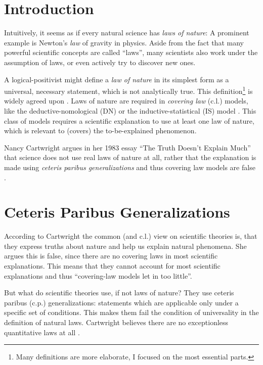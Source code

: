 \section*{Introduction}


Intuitively, it seems as if every natural science has \emph{laws of nature}:
A prominent example is Newton's \emph{law} of gravity in physics.
Aside from the fact that many powerful scientific concepts are called \enquote{laws},
many scientists also work under the assumption of laws, or
even actively try to discover new ones.

A logical-positivist might define a \emph{law of nature} in its simplest form as
a universal, necessary statement, which is not analytically true.
This definition\footnote{Many definitions are more elaborate,
    I focused on the most essential parts.}
is widely agreed upon \cite[57]{philsciencebook}.
Laws of nature are required in \emph{covering law} (c.l.) models, like the
deductive-nomological (DN)
or the inductive-statistical (IS) model \cite[Ch. 3]{philsciencebook}.
This class of models requires a scientific explanation to
use at least one law of nature, which is relevant to (covers) the to-be-explained phenomenon.

Nancy Cartwright argues in her 1983 essay \enquote{The Truth Doesn't Explain Much}
that science does not use real laws of nature at all, rather that the explanation
is made using \emph{ceteris paribus generalizations} and thus
covering law models are false \cite{cartwright1980truth}.


\section*{Ceteris Paribus Generalizations}
According to Cartwright the common (and c.l.) view on scientific theories is, that they
express truths about nature and help us explain natural phenomena.
She argues this is false, since there are no covering laws
in most scientific explanations.
This means that they cannot account for most scientific explanations and thus
\enquote{covering-law models let in too little}\cite[2]{cartwright1980truth}.

But what do scientific theories use, if not laws of nature?
They use ceteris paribus (c.p.) generalizations:
statements which are applicable only under a specific set of conditions.
This makes them fail the condition of universality in the
definition of natural laws.
Cartwright believes there are no
exceptionless quantitative laws at all \cite[2]{cartwright1980truth}.

